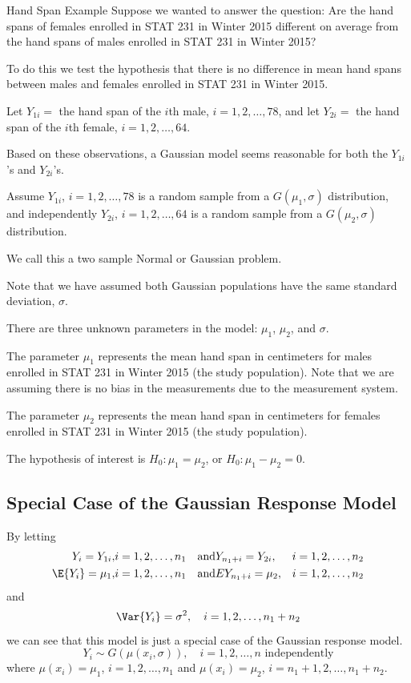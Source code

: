 \documentclass[oneside]{book}
\begin{document}
\begin{Example}{Hand Span Example}{}
    Suppose we wanted to answer the question: Are the hand spans of females enrolled
    in STAT 231 in Winter 2015 different on average from the hand spans of males enrolled
    in STAT 231 in Winter 2015?

    To do this we test the hypothesis that there is no difference in mean hand spans
    between males and females enrolled in STAT 231 in Winter 2015.

    Let $ Y_{1i}= $ the hand span of the $ i $th male, $ i=1,2,\ldots ,78 $,
    and let $ Y_{2i}= $ the hand span of the $ i $th female, $ i=1,2,\ldots ,64 $.

    Based on these observations, a Gaussian model seems reasonable for both the $ Y_{1i} $'s
    and $ Y_{2i} $'s.

    Assume $ Y_{1i} $, $ i=1,2,\ldots ,78 $ is a random sample from a $ G(\mu_1,\sigma) $
    distribution, and independently $ Y_{2i} $, $ i=1,2,\ldots ,64 $ is a random
    sample from a $ G(\mu_2,\sigma) $ distribution.

    We call this a two sample Normal or Gaussian problem.

    Note that we have assumed both Gaussian populations have the same standard deviation,
    $ \sigma $.

    There are three unknown parameters in the model: $ \mu_1 $, $ \mu_2 $, and $ \sigma $.

    The parameter $ \mu_1 $ represents the mean hand span in centimeters for males
    enrolled in STAT 231 in Winter 2015 (the study population). Note that we are assuming
    there is no bias in the measurements due to the measurement system.

    The parameter $ \mu_2 $ represents the mean hand span in centimeters for females
    enrolled in STAT 231 in Winter 2015 (the study population).

    The hypothesis of interest is $ H_0:\mu_1=\mu_2 $, or $ H_0:\mu_1-\mu_2=0 $.
\end{Example}


\subsection{Special Case of the Gaussian Response Model}
By letting
\[\begin{aligned}
        Y_{i}=Y_{1 i},     & i=1,2, \ldots, n_{1} & \text{and} & Y_{n_{1}+i}=Y_{2 i},    & i=1,2, \ldots, n_{2} \\
        \E{Y_{i}}=\mu_{1}, & i=1,2, \ldots, n_{1} & \text{and} & E{Y_{n_{1}+i}}=\mu_{2}, & i=1,2, \ldots, n_{2}
    \end{aligned}\]
and
\[\Var{Y_{i}}=\sigma^{2}, \quad i=1,2, \ldots, n_{1}+n_{2}\]
we can see that this model is just a special case of the Gaussian response model.
\[ Y_i\sim G\left( \mu(x_i,\sigma) \right),\quad i=1,2,\ldots ,n\text{ independently} \]
where $ \mu(x_i)=\mu_1 $, $ i=1,2,\ldots ,n_1 $ and $ \mu(x_i)=\mu_2 $, $ i=n_1+1,2,\ldots ,n_1+n_2 $.
\end{document}
